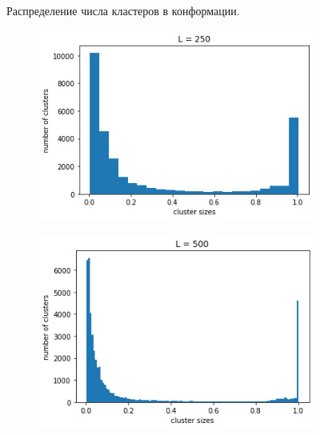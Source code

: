 \begin{figure}[H]
\begin{subfigure}[t]{0.3\textwidth}
	\end{subfigure}
	\caption{Распределение числа кластеров в конформации.}
\end{figure}

\begin{figure}[H]
	\centering
	\begin{subfigure}[t]{0.3\textwidth} 
		\includegraphics[width=\textwidth]{../images/cluster_sizes_L250.png} 
	\end{subfigure}
	\begin{subfigure}[t]{0.3\textwidth} 
		\includegraphics[width=\textwidth]{../images/cluster_sizes_L500.png} 
	\end{subfigure}
	\begin{subfigure}[t]{0.3\textwidth} 

\end{subfigure}
\end{figure}
